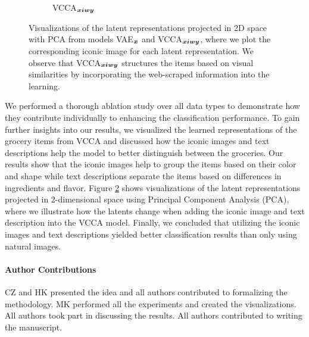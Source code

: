 \begin{figure}
\begin{subfigure}[b]{0.26\textwidth}
		\vspace{-7mm}
		\caption{VCCA$_{{\bm{x}} {\bm{i}} {\bm{w}} {\bm{y}}}$ }
		\label{fig:pca_latents_vcca_xiwy}
	\end{subfigure}
	\vspace{-6mm}
	\captionsetup{width=.46\textwidth}
	\caption{Visualizations of the latent representations projected in 2D space with PCA from models VAE$_{{\bm{x}}}$ and VCCA$_{{\bm{x}} {\bm{i}} {\bm{w}} {\bm{y}}}$, where we plot the corresponding iconic image for each latent representation. 
	We observe that VCCA$_{{\bm{x}} {\bm{i}} {\bm{w}} {\bm{y}}}$ structures the items based on visual similarities by incorporating the web-scraped information into the learning. 
	}
	\label{fig:paperB_pca_latents}
\end{figure} 
We performed a thorough ablation study over all data types to demonstrate how they contribute individually to enhancing the classification performance. To gain further insights into our results, we visualized the learned representations of the grocery items from VCCA and discussed how the iconic images and text descriptions help the model to better distinguish between the groceries. Our results show that the iconic images help to group the items based on their color and shape while text descriptions separate the items based on differences in ingredients and flavor. Figure \ref{fig:paperB_pca_latents} shows visualizations of the latent representations projected in 2-dimensional space using Principal Component Analysis (PCA), where we illustrate how the latents change when adding the iconic image and text description into the VCCA model. Finally, we concluded that utilizing the iconic images and text descriptions yielded better classification results than only using natural images. 


\paragraph{Author Contributions} 
CZ and HK presented the idea and all authors contributed to formalizing the methodology. 
MK performed all the experiments and created the visualizations. 
All authors took part in discussing the results.
All authors contributed to writing the manuscript. 


